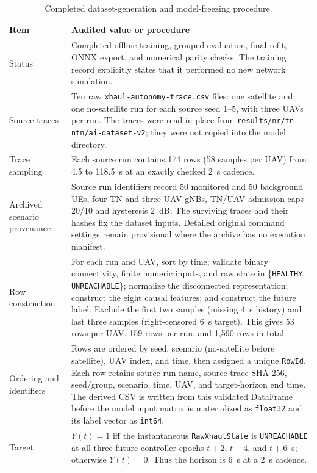 \begin{table}[t]
\centering
\footnotesize
\caption{Completed dataset-generation and model-freezing procedure.}
\label{tab:audited_dataset_procedure}
\begin{tabular}{p{} p{}}
\hline
Item & Audited value or procedure \\
\hline
Status & Completed offline training, grouped evaluation, final refit, ONNX export, and numerical parity checks.  The training record explicitly states that it performed no new network simulation. \\
Source traces & Ten raw \texttt{xhaul-\allowbreak autonomy-\allowbreak trace.csv} files: one satellite and one no-satellite run for each source seed 1--5, with three UAVs per run.  The traces were read in place from \texttt{results/\allowbreak nr/\allowbreak tn-\allowbreak ntn/\allowbreak ai-\allowbreak dataset-\allowbreak v2}; they were not copied into the model directory. \\
Trace sampling & Each source run contains 174 rows (58 samples per UAV) from 4.5 to 118.5~s at an exactly checked 2~s cadence. \\
Archived scenario provenance & Source run identifiers record 50 monitored and 50 background UEs, four TN and three UAV gNBs, TN/UAV admission caps 20/10 and hysteresis 2~dB. The surviving traces and their hashes fix the dataset inputs. Detailed original command settings remain provisional where the archive has no execution manifest. \\
Row construction & For each run and UAV, sort by time; validate binary connectivity, finite numeric inputs, and raw state in \{\texttt{HEALTHY}, \texttt{UNREACHABLE}\}; normalize the disconnected representation; construct the eight causal features; and construct the future label.  Exclude the first two samples (missing 4~s history) and last three samples (right-censored 6~s target).  This gives 53 rows per UAV, 159 rows per run, and 1,590 rows in total. \\
Ordering and identifiers & Rows are ordered by seed, scenario (no-satellite before satellite), UAV index, and time, then assigned a unique \texttt{RowId}.  Each row retains source-run name, source-trace SHA-256, seed/group, scenario, time, UAV, and target-horizon end time.  The derived CSV is written from this validated DataFrame before the model input matrix is materialized as \texttt{float32} and its label vector as \texttt{int64}. \\
Target & $Y(t)=1$ iff the instantaneous \texttt{Raw\allowbreak Xhaul\allowbreak State} is \texttt{UNREACHABLE} at all three future controller epochs $t+2$, $t+4$, and $t+6$~s; otherwise $Y(t)=0$.  Thus the horizon is 6~s at a 2~s cadence. \\

\end{tabular}
\end{table}
